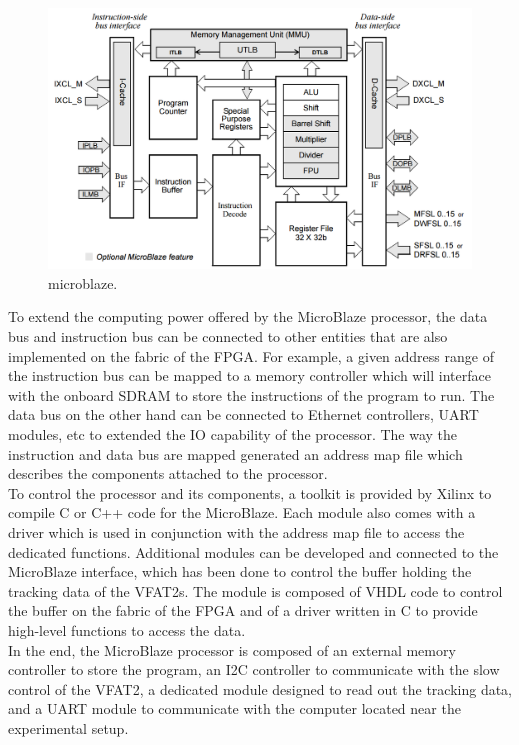       \begin{figure}[h!]
        \centering
        \includegraphics[width=\textwidth]{img/III-1-arch/microblaze.png}
        \caption{microblaze.}
        \label{fig:III-1-microblaze}
      \end{figure}

      To extend the computing power offered by the MicroBlaze processor, the data bus and instruction bus can be connected to other entities that are also implemented on the fabric of the FPGA. For example, a given address range of the instruction bus can be mapped to a memory controller which will interface with the onboard SDRAM to store the instructions of the program to run. The data bus on the other hand can be connected to Ethernet controllers, UART modules, etc to extended the IO capability of the processor. The way the instruction and data bus are mapped generated an address map file which describes the components attached to the processor. \\

      To control the processor and its components, a toolkit is provided by Xilinx to compile C or C++ code for the MicroBlaze. Each module also comes with a driver which is used in conjunction with the address map file to access the dedicated functions. Additional modules can be developed and connected to the MicroBlaze interface, which has been done to control the buffer holding the tracking data of the VFAT2s. The module is composed of VHDL code to control the buffer on the fabric of the FPGA and of a driver written in C to provide high-level functions to access the data. \\

      In the end, the MicroBlaze processor is composed of an external memory controller to store the program, an I2C controller to communicate with the slow control of the VFAT2, a dedicated module designed to read out the tracking data, and a UART module to communicate with the computer located near the experimental setup.  


